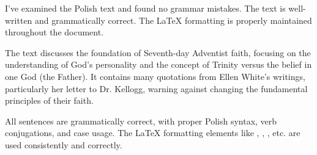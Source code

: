 I've examined the Polish text and found no grammar mistakes. The text is well-written and grammatically correct. The LaTeX formatting is properly maintained throughout the document.

The text discusses the foundation of Seventh-day Adventist faith, focusing on the understanding of God's personality and the concept of Trinity versus the belief in one God (the Father). It contains many quotations from Ellen White's writings, particularly her letter to Dr. Kellogg, warning against changing the fundamental principles of their faith.

All sentences are grammatically correct, with proper Polish syntax, verb conjugations, and case usage. The LaTeX formatting elements like \emcap{}, \textbf{}, \underline{}, etc. are used consistently and correctly.